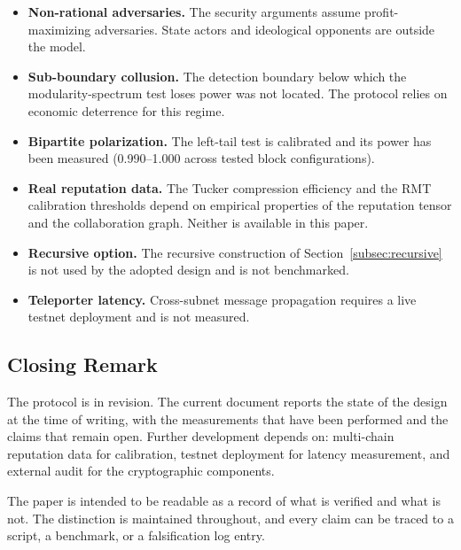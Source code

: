 \documentclass[11pt,a4paper]{article}
\numberwithin{equation}{section}
\numberwithin{table}{section}
\begin{document}
\begin{itemize}[leftmargin=*]
\item \textbf{Non-rational adversaries.} The security arguments assume profit-maximizing adversaries. State actors and ideological opponents are outside the model.
\item \textbf{Sub-boundary collusion.} The detection boundary below which the modularity-spectrum test loses power was not located. The protocol relies on economic deterrence for this regime.
\item \textbf{Bipartite polarization.} The left-tail test is calibrated and its power has been measured (0.990--1.000 across tested block configurations).
\item \textbf{Real reputation data.} The Tucker compression efficiency and the RMT calibration thresholds depend on empirical properties of the reputation tensor and the collaboration graph. Neither is available in this paper.
\item \textbf{Recursive option.} The recursive construction of Section~\ref{subsec:recursive} is not used by the adopted design and is not benchmarked.
\item \textbf{Teleporter latency.} Cross-subnet message propagation requires a live testnet deployment and is not measured.
\end{itemize}

\subsection{Closing Remark}
The protocol is in revision. The current document reports the state of the design at the time of writing, with the measurements that have been performed and the claims that remain open. Further development depends on: multi-chain reputation data for calibration, testnet deployment for latency measurement, and external audit for the cryptographic components.

The paper is intended to be readable as a record of what is verified and what is not. The distinction is maintained throughout, and every claim can be traced to a script, a benchmark, or a falsification log entry.
\end{document}
